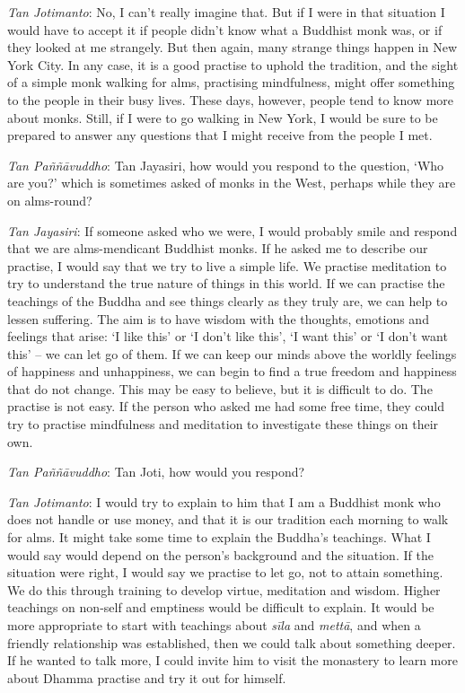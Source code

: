 \emph{Tan Jotimanto}: No, I can't really imagine that. But if I were in
that situation I would have to accept it if people didn't know what a
Buddhist monk was, or if they looked at me strangely. But then again, 
many strange things happen in New York City. In any case, it is a good
practise to uphold the tradition, and the sight of a simple monk walking
for alms, practising mindfulness, might offer something to the people in
their busy lives. These days, however, people tend to know more about
monks. Still, if I were to go walking in New York, I would be sure to be
prepared to answer any questions that I might receive from the people I
met. 

\emph{Tan Paññāvuddho}: Tan Jayasiri, how would you respond to the
question, `Who are you?' which is sometimes asked of monks in the West, 
perhaps while they are on alms-round? 

\emph{Tan Jayasiri}: If someone asked who we were, I would probably
smile and respond that we are alms-mendicant Buddhist monks. If he asked
me to describe our practise, I would say that we try to live a simple
life. We practise meditation to try to understand the true nature of
things in this world. If we can practise the teachings of the Buddha and
see things clearly as they truly are, we can help to lessen suffering. 
The aim is to have wisdom with the thoughts, emotions and feelings that
arise: `I like this' or `I don't like this', `I want this' or `I don't
want this' -- we can let go of them. If we can keep our minds above the
worldly feelings of happiness and unhappiness, we can begin to find a
true freedom and happiness that do not change. This may be easy to
believe, but it is difficult to do. The practise is not easy. If the
person who asked me had some free time, they could try to practise
mindfulness and meditation to investigate these things on their own. 

\emph{Tan Paññāvuddho}: Tan Joti, how would you respond? 

\emph{Tan Jotimanto}: I would try to explain to him that I am a Buddhist
monk who does not handle or use money, and that it is our tradition each
morning to walk for alms. It might take some time to explain the
Buddha's teachings. What I would say would depend on the person's
background and the situation. If the situation were right, I would say
we practise to let go, not to attain something. We do this through
training to develop virtue, meditation and wisdom. Higher teachings on
non-self and emptiness would be difficult to explain. It would be more
appropriate to start with teachings about \emph{sīla} and \emph{mettā}, 
and when a friendly relationship was established, then we could talk
about something deeper. If he wanted to talk more, I could invite him to
visit the monastery to learn more about Dhamma practise and try it out
for himself. 

